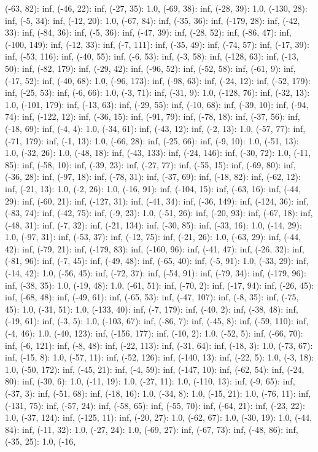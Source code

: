 \documentclass[parskip=half]{scrartcl}
\begin{document}
(-63, 82): inf, (-46, 22): inf, (-27, 35): 1.0, (-69, 38): inf, (-28, 39): 1.0, (-130, 28): inf, (-5, 34): inf, (-12, 20): 1.0, (-67, 84): inf, (-35, 36): inf, (-179, 28): inf, (-42, 33): inf, (-84, 36): inf, (-5, 36): inf, (-47, 39): inf, (-28, 52): inf, (-86, 47): inf, (-100, 149): inf, (-12, 33): inf, (-7, 111): inf, (-35, 49): inf, (-74, 57): inf, (-17, 39): inf, (-53, 116): inf, (-40, 55): inf, (-6, 53): inf, (-3, 58): inf, (-128, 63): inf, (-13, 50): inf, (-82, 179): inf, (-29, 42): inf, (-96, 52): inf, (-52, 58): inf, (-61, 9): inf, (-17, 52): inf, (-40, 68): 1.0, (-96, 173): inf, (-98, 63): inf, (-24, 12): inf, (-52, 179): inf, (-25, 53): inf, (-6, 66): 1.0, (-3, 71): inf, (-31, 9): 1.0, (-128, 76): inf, (-32, 13): 1.0, (-101, 179): inf, (-13, 63): inf, (-29, 55): inf, (-10, 68): inf, (-39, 10): inf, (-94, 74): inf, (-122, 12): inf, (-36, 15): inf, (-91, 79): inf, (-78, 18): inf, (-37, 56): inf, (-18, 69): inf, (-4, 4): 1.0, (-34, 61): inf, (-43, 12): inf, (-2, 13): 1.0, (-57, 77): inf, (-71, 179): inf, (-1, 13): 1.0, (-66, 28): inf, (-25, 66): inf, (-9, 10): 1.0, (-51, 13): 1.0, (-32, 26): 1.0, (-48, 18): inf, (-43, 133): inf, (-24, 146): inf, (-30, 72): 1.0, (-11, 85): inf, (-58, 10): inf, (-39, 23): inf, (-27, 77): inf, (-55, 15): inf, (-69, 80): inf, (-36, 28): inf, (-97, 18): inf, (-78, 31): inf, (-37, 69): inf, (-18, 82): inf, (-62, 12): inf, (-21, 13): 1.0, (-2, 26): 1.0, (-16, 91): inf, (-104, 15): inf, (-63, 16): inf, (-44, 29): inf, (-60, 21): inf, (-127, 31): inf, (-41, 34): inf, (-36, 149): inf, (-124, 36): inf, (-83, 74): inf, (-42, 75): inf, (-9, 23): 1.0, (-51, 26): inf, (-20, 93): inf, (-67, 18): inf, (-48, 31): inf, (-7, 32): inf, (-21, 134): inf, (-30, 85): inf, (-33, 16): 1.0, (-14, 29): 1.0, (-97, 31): inf, (-53, 37): inf, (-12, 75): inf, (-21, 26): 1.0, (-63, 29): inf, (-44, 42): inf, (-79, 21): inf, (-179, 83): inf, (-160, 96): inf, (-41, 47): inf, (-26, 32): inf, (-81, 96): inf, (-7, 45): inf, (-49, 48): inf, (-65, 40): inf, (-5, 91): 1.0, (-33, 29): inf, (-14, 42): 1.0, (-56, 45): inf, (-72, 37): inf, (-54, 91): inf, (-79, 34): inf, (-179, 96): inf, (-38, 35): 1.0, (-19, 48): 1.0, (-61, 51): inf, (-70, 2): inf, (-17, 94): inf, (-26, 45): inf, (-68, 48): inf, (-49, 61): inf, (-65, 53): inf, (-47, 107): inf, (-8, 35): inf, (-75, 45): 1.0, (-31, 51): 1.0, (-133, 40): inf, (-7, 179): inf, (-40, 2): inf, (-38, 48): inf, (-19, 61): inf, (-3, 5): 1.0, (-103, 67): inf, (-86, 7): inf, (-45, 8): inf, (-59, 110): inf, (-4, 46): 1.0, (-40, 123): inf, (-156, 177): inf, (-10, 2): 1.0, (-52, 5): inf, (-66, 70): inf, (-6, 121): inf, (-8, 48): inf, (-22, 113): inf, (-31, 64): inf, (-18, 3): 1.0, (-73, 67): inf, (-15, 8): 1.0, (-57, 11): inf, (-52, 126): inf, (-140, 13): inf, (-22, 5): 1.0, (-3, 18): 1.0, (-50, 172): inf, (-45, 21): inf, (-4, 59): inf, (-147, 10): inf, (-62, 54): inf, (-24, 80): inf, (-30, 6): 1.0, (-11, 19): 1.0, (-27, 11): 1.0, (-110, 13): inf, (-9, 65): inf, (-37, 3): inf, (-51, 68): inf, (-18, 16): 1.0, (-34, 8): 1.0, (-15, 21): 1.0, (-76, 11): inf, (-131, 75): inf, (-57, 24): inf, (-58, 65): inf, (-55, 70): inf, (-64, 21): inf, (-23, 22): 1.0, (-37, 124): inf, (-125, 11): inf, (-20, 27): 1.0, (-62, 67): 1.0, (-30, 19): 1.0, (-44, 84): inf, (-11, 32): 1.0, (-27, 24): 1.0, (-69, 27): inf, (-67, 73): inf, (-48, 86): inf, (-35, 25): 1.0, (-16, 
\end{document}
